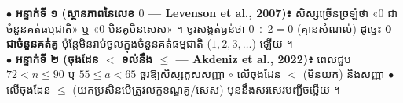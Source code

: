 \documentclass[a4paper,10pt]{article}
\newcommand{\en}[1]{{\TimesEn #1}}
\begin{document}
\begin{tcolorbox}[
  enhanced, sharp corners, colback=panelgray, colframe=black,
  boxrule=0.85pt, boxsep=2.5pt, top=4.5pt, bottom=4.5pt, left=6pt, right=6pt
]
  \fontsize{8.8pt}{13.2pt}\selectfont
  $\bullet$ \textbf{អន្ទាក់ទី ១ (ស្ថានភាពនៃលេខ $0$ — \en{Levenson et al., 2007})៖} សិស្សច្រើនច្រឡំថា «$0$ ជាចំនួនគត់ធម្មជាតិ» ឬ «$0$ មិនគូមិនសេស» ។ ចូរសង្កត់ធ្ងន់ថា $0 \div 2 = 0$ (គ្មានសំណល់) ដូច្នេះ $\mathbf{0}$ \textbf{ជាចំនួនគត់គូ} ប៉ុន្តែមិនរាប់ចូលក្នុងចំនួនគត់ធម្មជាតិ ($1, 2, 3, \dots$) ឡើយ ។\\[2.5pt]
  $\bullet$ \textbf{អន្ទាក់ទី ២ (ចុងដែន $<$ ទល់នឹង $\le$ — \en{Akdeniz et al., 2022})៖} ពេលជួប $72 < n \le 90$ ឬ $55 \le a < 65$ ចូរឱ្យសិស្សគូសសញ្ញា $\circ$ លើចុងដែន $<$ (មិនយក) និងសញ្ញា $\bullet$ លើចុងដែន $\le$ (យកប្រសិនបើត្រូវលក្ខខណ្ឌគូ/សេស) មុននឹងសរសេរបញ្ជីចម្លើយ ។
\end{tcolorbox}
\end{document}
